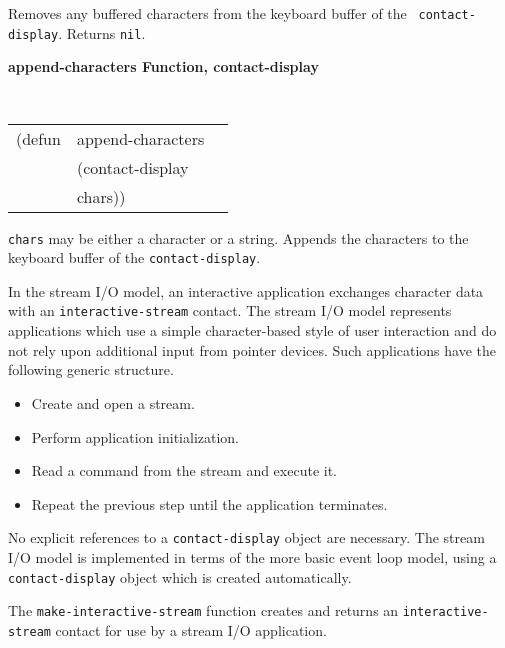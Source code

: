 \begin{flushright} \parbox[t]{6.125in}{
Removes any buffered characters from the keyboard buffer of the {\tt
contact-display}. Returns {\tt nil}.
 
}
\end{flushright}

{\samepage
{\large {\bf append-characters \hfill Function, contact-display}}
\begin{flushright} \parbox[t]{6.125in}{
\tt
\begin{tabular}{lll}
\raggedright
(defun & append-characters & \\
& (contact-display\\
& chars))
\end{tabular}
\rm

}\end{flushright}}

\begin{flushright} \parbox[t]{6.125in}{
{\tt chars} may be either a character or a string. Appends the characters
to the keyboard buffer of the {\tt contact-display}.
 
}
\end{flushright}


In the stream I/O model, an interactive application exchanges character data
with an {\tt interactive-stream} contact. 
The stream I/O model represents applications which use a simple character-based
style of user interaction and do not rely upon additional input from
pointer devices.  Such applications have the following generic structure.
\begin{itemize}
\item Create and open a stream.
\item Perform application initialization.
\item Read a command from the stream and execute it. 
\item Repeat the previous step until the
application terminates.
\end{itemize}
No explicit references to a {\tt contact-display} object are necessary. The
stream I/O model is implemented in terms of the more basic event loop model,
using a {\tt contact-display} object which is created automatically. 

The {\tt make-interactive-stream} function creates and returns an {\tt interactive-stream} contact for
use by a stream I/O application.

